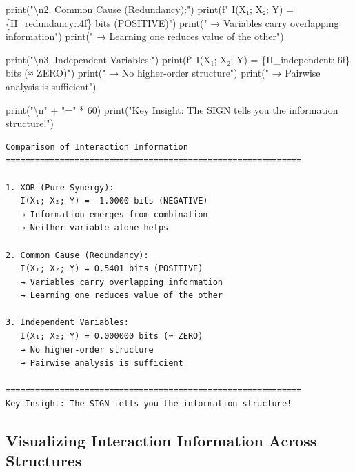 \documentclass[
  11pt,
  letterpaper,
  oneside,
  openany]{book}
\newenvironment{Shaded}{\begin{snugshade}}{\end{snugshade}}
\newcommand{\BuiltInTok}[1]{\textcolor[rgb]{0.00,0.23,0.31}{#1}}
\newcommand{\CharTok}[1]{\textcolor[rgb]{0.13,0.47,0.30}{#1}}
\newcommand{\DecValTok}[1]{\textcolor[rgb]{0.68,0.00,0.00}{#1}}
\newcommand{\NormalTok}[1]{\textcolor[rgb]{0.00,0.23,0.31}{#1}}
\newcommand{\OperatorTok}[1]{\textcolor[rgb]{0.37,0.37,0.37}{#1}}
\newcommand{\SpecialCharTok}[1]{\textcolor[rgb]{0.37,0.37,0.37}{#1}}
\newcommand{\SpecialStringTok}[1]{\textcolor[rgb]{0.13,0.47,0.30}{#1}}
\newcommand{\StringTok}[1]{\textcolor[rgb]{0.13,0.47,0.30}{#1}}
\begin{document}
\begin{Shaded}
\begin{Highlighting}[]
\BuiltInTok{print}\NormalTok{(}\StringTok{"}\CharTok{\textbackslash{}n}\StringTok{2. Common Cause (Redundancy):"}\NormalTok{)}
\BuiltInTok{print}\NormalTok{(}\SpecialStringTok{f"   I(X₁; X₂; Y) = }\SpecialCharTok{\{}\NormalTok{II\_redundancy}\SpecialCharTok{:.4f\}}\SpecialStringTok{ bits (POSITIVE)"}\NormalTok{)}
\BuiltInTok{print}\NormalTok{(}\StringTok{"   → Variables carry overlapping information"}\NormalTok{)}
\BuiltInTok{print}\NormalTok{(}\StringTok{"   → Learning one reduces value of the other"}\NormalTok{)}

\BuiltInTok{print}\NormalTok{(}\StringTok{"}\CharTok{\textbackslash{}n}\StringTok{3. Independent Variables:"}\NormalTok{)}
\BuiltInTok{print}\NormalTok{(}\SpecialStringTok{f"   I(X₁; X₂; Y) = }\SpecialCharTok{\{}\NormalTok{II\_independent}\SpecialCharTok{:.6f\}}\SpecialStringTok{ bits (≈ ZERO)"}\NormalTok{)}
\BuiltInTok{print}\NormalTok{(}\StringTok{"   → No higher{-}order structure"}\NormalTok{)}
\BuiltInTok{print}\NormalTok{(}\StringTok{"   → Pairwise analysis is sufficient"}\NormalTok{)}

\BuiltInTok{print}\NormalTok{(}\StringTok{"}\CharTok{\textbackslash{}n}\StringTok{"} \OperatorTok{+} \StringTok{"="} \OperatorTok{*} \DecValTok{60}\NormalTok{)}
\BuiltInTok{print}\NormalTok{(}\StringTok{"Key Insight: The SIGN tells you the information structure!"}\NormalTok{)}
\end{Highlighting}
\end{Shaded}

\begin{verbatim}
Comparison of Interaction Information
============================================================

1. XOR (Pure Synergy):
   I(X₁; X₂; Y) = -1.0000 bits (NEGATIVE)
   → Information emerges from combination
   → Neither variable alone helps

2. Common Cause (Redundancy):
   I(X₁; X₂; Y) = 0.5401 bits (POSITIVE)
   → Variables carry overlapping information
   → Learning one reduces value of the other

3. Independent Variables:
   I(X₁; X₂; Y) = 0.000000 bits (≈ ZERO)
   → No higher-order structure
   → Pairwise analysis is sufficient

============================================================
Key Insight: The SIGN tells you the information structure!
\end{verbatim}

\subsection{Visualizing Interaction Information Across
Structures}\label{visualizing-interaction-information-across-structures}
\end{document}
